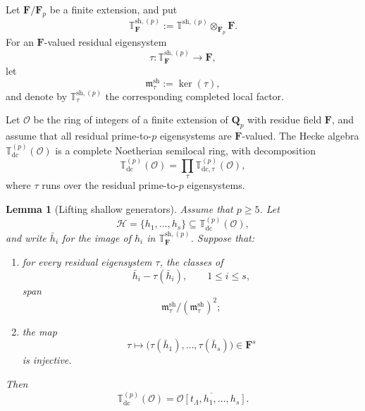 \documentclass[11pt]{article}
\theoremstyle{plain}
\newtheorem{lemma}[theorem]{Lemma}
\theoremstyle{definition}
\theoremstyle{remark}
\numberwithin{equation}{section}
\begin{document}
Let \(\mathbf F/\mathbf F_p\) be a finite extension, and put \[\mathbb T_{\mathbf F}^{\mathrm{sh},(p)}:=\mathbb T^{\mathrm{sh},(p)}\otimes_{\mathbf F_p}\mathbf F.\] For an \(\mathbf F\)-valued residual eigensystem
\[\tau:\mathbb T_{\mathbf F}^{\mathrm{sh},(p)}\longrightarrow\mathbf F,\] let \[\mathfrak m_\tau^{\mathrm{sh}}:=\ker(\tau),\] and denote by \(\mathbb T_\tau^{\mathrm{sh},(p)}\) the corresponding completed local factor.

Let \(\mathcal O\) be the ring of integers of a finite extension of \(\mathbf Q_p\) with residue field \(\mathbf F\), and assume that all residual prime-to-\(p\) eigensystems are \(\mathbf F\)-valued. The Hecke algebra \(\mathbb T_{\mathrm{dc}}^{(p)}(\mathcal O)\) is a complete Noetherian semilocal ring, with decomposition \[\mathbb T_{\mathrm{dc}}^{(p)}(\mathcal O)=\prod_\tau\mathbb T_{\mathrm{dc},\tau}^{(p)}(\mathcal O),\] where \(\tau\) runs over the residual prime-to-\(p\) eigensystems. 

\begin{lemma}[Lifting shallow generators]
\label{lem:shallow-lifting}
Assume that \(p\geq5\). Let \[\mathcal H=\{h_1,\ldots,h_s\}\subseteq\mathbb T_{\mathrm{dc}}^{(p)}(\mathcal O),\] and write \(\bar h_i\) for the image of \(h_i\) in \(\mathbb T_{\mathbf F}^{\mathrm{sh},(p)}\). Suppose that:
\begin{enumerate}
\item for every residual eigensystem \(\tau\), the classes of \[
\bar h_i-\tau(\bar h_i),\qquad 1\leq i\leq s,\] span \[\mathfrak m_\tau^{\mathrm{sh}}/(\mathfrak m_\tau^{\mathrm{sh}})^2;\]
\item the map \[\tau\longmapsto\bigl(\tau(\bar h_1),\ldots,\tau(\bar h_s)\bigr)\in\mathbf F^s\] is injective.
\end{enumerate}

Then \[\mathbb T_{\mathrm{dc}}^{(p)}(\mathcal O)=\overline{\mathcal O[t_\Lambda,h_1,\ldots,h_s]}.\]
\end{lemma}
\end{document}
